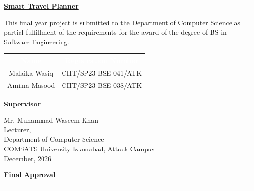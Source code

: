 \documentclass[A4paper,12pt]{report}
\theoremstyle{plain}
\theoremstyle{definition}
\theoremstyle{remark}
\numberwithin{equation}{section}
\begin{document}
\newpage
\begin{center}
\onehalfspacing\LARGE \uline{\textbf{Smart Travel Planner}}\\
\end{center}
\vspace{0.2in}

\onehalfspacing\noindent\large{This final year project is submitted to the Department of Computer Science as partial fulfillment of the requirements for the award of the degree of BS in Software Engineering.}
\vspace{0.4in}
\begin{table}[ht!]
\centering
{\setlength{\arrayrulewidth}{0.7mm}
\setlength{\tabcolsep}{45pt}
\renewcommand{\arraystretch}{2.2}
\begin{tabular}{|c|c|}
\hline
\rowcolor[HTML]{656565}
 \large{\textbf{\textcolor{white}{Name}}} &\large{\textbf{\textcolor{white}{Registration Number}}}  \\
 \hline
 Malaika Wasiq & CIIT/SP23-BSE-041/ATK \\ \hline
 Amima Masood & CIIT/SP23-BSE-038/ATK \\ \hline
\end{tabular}
}
\end{table}
\FloatBarrier
\vspace{1.5in}

\noindent\large{\textbf{Supervisor}}
\begin{flushleft}
\vspace{0.2in}
\large{Mr. Muhammad Waseem Khan\\
\vspace{0.1in}
Lecturer,\\
Department of Computer Science\\
\vspace{0.1in}
COMSATS University Islamabad, Attock Campus\\

\vspace{0.2in}
December, 2026 }
\end{flushleft}



\newpage
\begin{center}
\Large{\textbf{{Final Approval}}}
\par\noindent\rule{\textwidth}{0.6pt}
\end{center}
\end{document}
